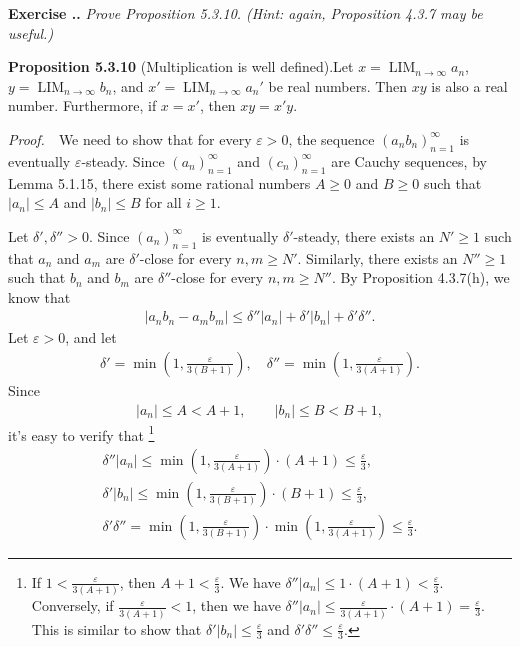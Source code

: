 \documentclass{book}
\DeclareMathOperator{\tlim}{LIM}%
\newcommand{\pff}{\vspace{.25em}\noindent\emph{Proof.}~~}
\newcommand{\titl}[1]{\noindent\textbf{#1}}
\newcounter{Exercise}[section]
\renewcommand{\theExercise}{\thesection.\arabic{Exercise}.}
\newcommand{\new}{\vspace{1.5em}\noindent\textbf{{Exercise \stepcounter{Exercise}\textbf{\theExercise}}} }
\begin{document}
\new\emph{Prove Proposition 5.3.10. (Hint: again, Proposition 4.3.7 may be useful.)}

\begin{framed}
\titl{Proposition 5.3.10} (Multiplication is well defined).\qquad Let $x=\tlim_{n\to\infty}a_n$, $y=\tlim_{n\to\infty}b_n$, and $x'=\tlim_{n\to\infty}a_n'$ be real numbers. Then $xy$ is also a real number. Furthermore, if $x=x'$, then $xy=x'y$.
\end{framed}

\pff We need to show that for every $\varepsilon>0$, the sequence $(a_nb_n)_{n=1}^\infty$ is eventually $\varepsilon$-steady. Since $(a_n)_{n=1}^\infty$ and $(c_n)_{n=1}^\infty$ are Cauchy sequences, by Lemma 5.1.15, there exist some rational numbers $A\geq 0$ and $B\geq 0$ such that $|a_n|\leq A$ and $|b_n|\leq B$ for all $i\geq 1$.

Let $\delta',\delta''>0$. Since $(a_n)_{n=1}^\infty$ is eventually $\delta'$-steady, there exists an $N'\geq 1$ such that $a_n$ and $a_m$ are $\delta'$-close for every $n,m\geq N'$. Similarly, there exists an $N''\geq 1$ such that $b_n$ and $b_m$ are $\delta''$-close for every $n,m\geq N''$. By Proposition 4.3.7(h), we know that
\begin{align*}
    |a_nb_n-a_mb_m|
    \leq\delta''|a_n|+\delta'|b_n|+\delta'\delta''.
\end{align*}
Let $\varepsilon>0$, and let
    \begin{align*}
        \delta'=\min\left(1,\frac{\varepsilon}{3(B+1)}\right),\quad\delta''=\min\left(1,\frac{\varepsilon}{3(A+1)}\right).
    \end{align*}
Since
    \begin{align*}
        |a_n|\leq A<A+1,\qquad |b_n|\leq B<B+1,
    \end{align*}
it's easy to verify that
\footnote{If $1<\frac{\varepsilon}{3(A+1)}$, then $A+1<\frac{\varepsilon}{3}$. We have $\delta''|a_n|\leq 1\cdot(A+1)<\frac{\varepsilon}{3}$. Conversely, if $\frac{\varepsilon}{3(A+1)}<1$, then we have $\delta''|a_n|\leq\frac{\varepsilon}{3(A+1)}\cdot(A+1)=\frac{\varepsilon}{3}$. This is similar to show that $\delta'|b_n|\leq\frac{\varepsilon}{3}$ and $\delta'\delta''\leq\frac{\varepsilon}{3}$.}
    \begin{gather*}
        \delta''|a_n|\leq\min\left(1,\frac{\varepsilon}{3(A+1)}\right)\cdot(A+1)\leq\frac{\varepsilon}{3},\\
        \delta'|b_n|\leq\min\left(1,\frac{\varepsilon}{3(B+1)}\right)\cdot(B+1)\leq\frac{\varepsilon}{3},\\
        \delta'\delta''=\min\left(1,\frac{\varepsilon}{3(B+1)}\right)\cdot\min\left(1,\frac{\varepsilon}{3(A+1)}\right)\leq\frac{\varepsilon}{3}.
    \end{gather*}
\end{document}
